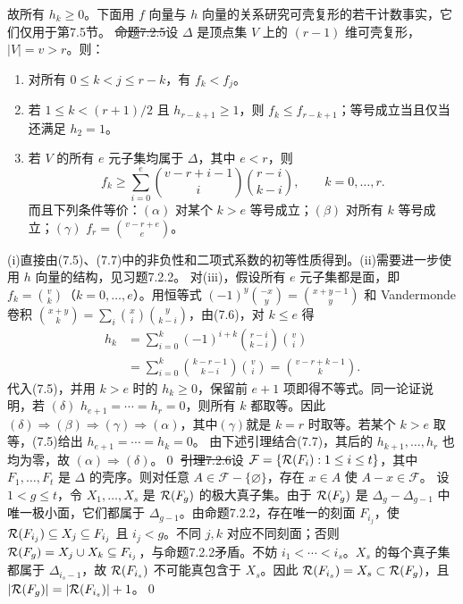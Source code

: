 故所有 $h_k\ge0$。下面用 $f$ 向量与 $h$ 向量的关系研究可壳复形的若干计数事实，它们仅用于第7.5节。
\st{命题7.2.5}设 $\Delta$ 是顶点集 $V$ 上的 $(r-1)$ 维可壳复形，$|V|=v>r$。则：
\begin{enumerate}[label=(\roman*)]
\item 对所有 $0\le k<j\le r-k$，有 $f_k<f_j$。
\item 若 $1\le k<(r+1)/2$ 且 $h_{r-k+1}\ge1$，则 $f_k\le f_{r-k+1}$；等号成立当且仅当还满足 $h_2=1$。
\item 若 $V$ 的所有 $e$ 元子集均属于 $\Delta$，其中 $e<r$，则
\[f_k\ge\sum_{i=0}^e\binom{v-r+i-1}{i}\binom{r-i}{k-i},\qquad k=0,\ldots,r.\]
而且下列条件等价：$(\alpha)$ 对某个 $k>e$ 等号成立；$(\beta)$ 对所有 $k$ 等号成立；$(\gamma)$ $f_r=\binom{v-r+e}{e}$。
\end{enumerate}
\pr (i)直接由(7.5)、(7.7)中的非负性和二项式系数的初等性质得到。(ii)需要进一步使用 $h$ 向量的结构，见习题7.2.2。
对(iii)，假设所有 $e$ 元子集都是面，即 $f_k=\binom vk$（$k=0,\ldots,e$）。用恒等式 $(-1)^y\binom{-x}{y}=\binom{x+y-1}{y}$ 和 Vandermonde 卷积 $\binom{x+y}k=\sum_i\binom xi\binom y{k-i}$，由(7.6)，对 $k\le e$ 得
\[\begin{aligned}
h_k&=\sum_{i=0}^k(-1)^{i+k}\binom{r-i}{k-i}\binom vi\\
&=\sum_{i=0}^k\binom{k-r-1}{k-i}\binom vi=\binom{v-r+k-1}k.
\end{aligned}\tag{7.8}\]
代入(7.5)，并用 $k>e$ 时的 $h_k\ge0$，保留前 $e+1$ 项即得不等式。同一论证说明，若 $(\delta)$ $h_{e+1}=\cdots=h_r=0$，则所有 $k$ 都取等。因此 $(\delta)\Rightarrow(\beta)\Rightarrow(\gamma)\Rightarrow(\alpha)$，其中$(\gamma)$就是 $k=r$ 时取等。若某个 $k>e$ 取等，(7.5)给出 $h_{e+1}=\cdots=h_k=0$。
由下述引理结合(7.7)，其后的 $h_{k+1},\ldots,h_r$ 也均为零，故 $(\alpha)\Rightarrow(\delta)$。\qed
\st{引理7.2.6}设 $\mathcal F=\{\mathcal R(F_i):1\le i\le t\}$，其中 $F_1,\ldots,F_t$ 是 $\Delta$ 的壳序。则对任意 $A\in\mathcal F-\{\varnothing\}$，存在 $x\in A$ 使 $A-x\in\mathcal F$。
\pr 设 $1<g\le t$，令 $X_1,\ldots,X_s$ 是 $\mathcal R(F_g)$ 的极大真子集。由于 $\mathcal R(F_g)$ 是 $\Delta_g-\Delta_{g-1}$ 中唯一极小面，它们都属于 $\Delta_{g-1}$。由命题7.2.2，存在唯一的刻面 $F_{i_j}$，使 $\mathcal R(F_{i_j})\subseteq X_j\subseteq F_{i_j}$ 且 $i_j<g$。不同 $j,k$ 对应不同刻面；否则 $\mathcal R(F_g)=X_j\cup X_k\subseteq F_{i_j}$，与命题7.2.2矛盾。不妨 $i_1<\cdots<i_s$。$X_s$ 的每个真子集都属于 $\Delta_{i_s-1}$，故 $\mathcal R(F_{i_s})$ 不可能真包含于 $X_s$。因此 $\mathcal R(F_{i_s})=X_s\subset\mathcal R(F_g)$，且 $|\mathcal R(F_g)|=|\mathcal R(F_{i_s})|+1$。\qed

